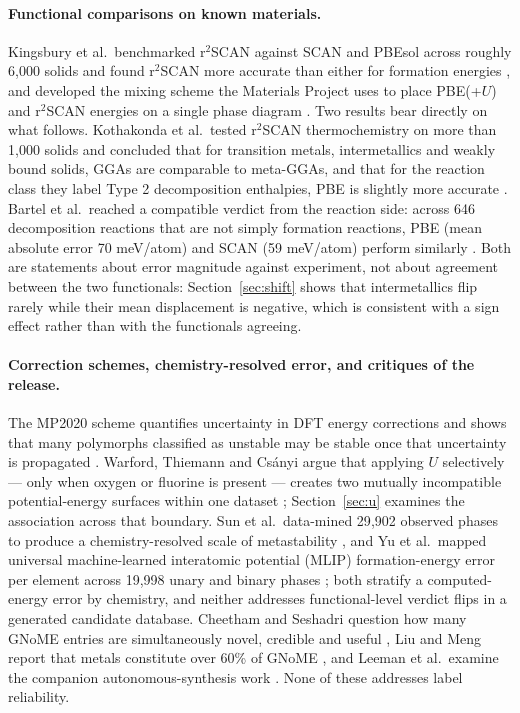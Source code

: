 \documentclass[11pt]{article}
\begin{document}
\paragraph{Functional comparisons on known materials.}\label{sec:related-func}
Kingsbury et al.\ benchmarked r$^2$SCAN against SCAN and PBEsol across roughly 6{,}000
solids and found r$^2$SCAN more accurate than either for formation energies
\citep{kingsbury2022prm}, and developed the mixing scheme the Materials Project uses to
place PBE(+$U$) and r$^2$SCAN energies on a single phase diagram \citep{kingsbury2022npj}.
Two results bear directly on what follows. Kothakonda et al.\ tested r$^2$SCAN
thermochemistry on more than 1{,}000 solids and concluded that for transition metals,
intermetallics and weakly bound solids, GGAs are comparable to meta-GGAs, and that for
the reaction class they label Type 2 decomposition enthalpies, PBE is slightly more accurate \citep{kothakonda2023}.
Bartel et al.\ reached a compatible verdict from the reaction side: across 646
decomposition reactions that are not simply formation reactions, PBE (mean absolute error 70 meV/atom) and
SCAN (59 meV/atom) perform similarly \citep{bartel2019}. Both are statements about error
magnitude against experiment, not about agreement between the two functionals:
Section~\ref{sec:shift} shows that intermetallics flip rarely while their mean
displacement is negative, which is consistent with a sign effect rather than with the
functionals agreeing.

\paragraph{Correction schemes, chemistry-resolved error, and critiques of the release.}
The MP2020 scheme quantifies uncertainty in DFT energy corrections and shows that many
polymorphs classified as unstable may be stable once that uncertainty is propagated
\citep{wang2021mp2020}. Warford, Thiemann and Cs\'anyi argue that applying $U$ selectively
--- only when oxygen or fluorine is present --- creates two mutually incompatible
potential-energy surfaces within one dataset \citep{warford2026}; Section~\ref{sec:u}
examines the association across that boundary. Sun et al.\ data-mined 29{,}902 observed
phases to produce a chemistry-resolved scale of metastability \citep{sun2016}, and Yu et
al.\ mapped universal machine-learned interatomic potential (MLIP) formation-energy error per element across 19{,}998 unary and
binary phases \citep{yu2024}; both stratify a computed-energy error by chemistry, and
neither addresses functional-level verdict flips in a generated candidate database.
Cheetham and Seshadri question how many GNoME entries are simultaneously novel,
credible and useful \citep{cheetham2024}, Liu and Meng report that metals constitute
over 60\% of GNoME \citep{liu2024}, and Leeman et al.\ examine the companion
autonomous-synthesis work \citep{leeman2024,szymanski2023,szymanski2026}. None of these
addresses label reliability.
\end{document}
